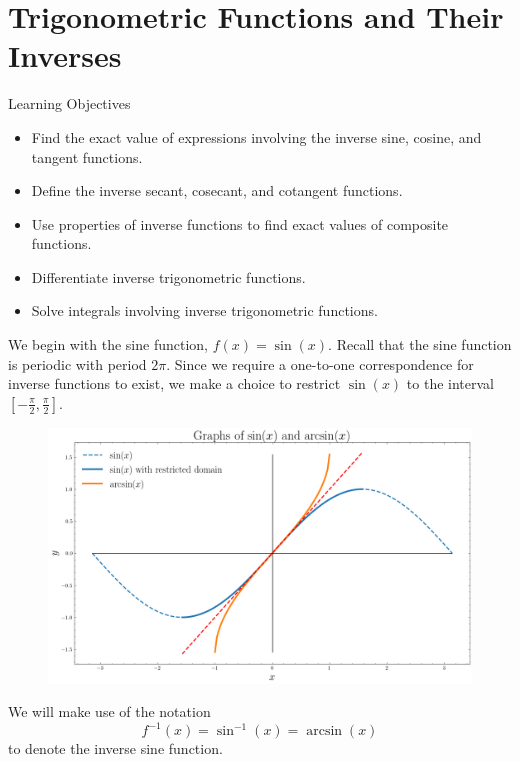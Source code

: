 \documentclass[compacto,10pt,comentarios]{aleph-notas}
\begin{document}
\encabezado

\section*{Trigonometric Functions and Their Inverses}
\begin{mdframed}
    \center Learning Objectives \\
    \begin{itemize}
        \item Find the exact value of expressions involving the inverse sine, cosine, and tangent functions.
        \item Define the inverse secant, cosecant, and cotangent functions. 
        \item Use properties of inverse functions to find exact values of composite functions.
        \item Differentiate inverse trigonometric functions.
        \item Solve integrals involving inverse trigonometric functions.
    \end{itemize}
\end{mdframed}

We begin with the sine function, $f(x) = \sin(x)$. Recall that the sine function is periodic with period $2\pi$. Since we require a one-to-one correspondence for inverse functions to exist, we make a choice to restrict $\sin(x)$ to the interval $[-\frac{\pi}{2}, \frac{\pi}{2}]$.

\begin{figure}[h!]
    \centering
        \includegraphics[width=1\linewidth]{../Images/07_05_sine.png}
\end{figure}

We will make use of the notation
$$
    f^{-1}(x) = \sin^{-1}(x) = \arcsin(x)
$$
to denote the inverse sine function.
\end{document}
